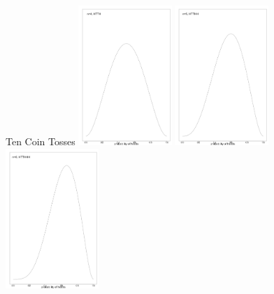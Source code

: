 \documentclass[dvipsnames,mathserif, handout]{beamer}
\begin{document}
{\begin{frame}{Ten Coin Tosses}
    	\includegraphics[width=100pt]{cointosses/Four.pdf}	\pause
    	\includegraphics[width=100pt]{cointosses/Five.pdf}	\pause
    	\includegraphics[width=100pt]{cointosses/Six.pdf} 
\end{frame}

}
\end{document}

